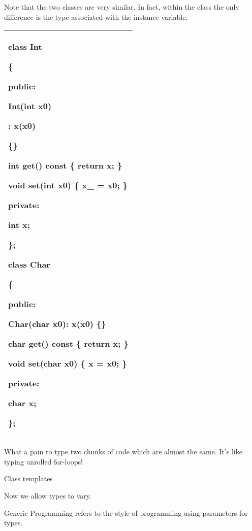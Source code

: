 \documentclass[
]{article}
\begin{document}
Note that the two classes are very similar. In fact, within the class
the only difference is the type associated with the instance variable.

\begin{longtable}[]{@{}l@{}}
\toprule
\endhead
\begin{minipage}[t]{0.97\columnwidth}\raggedright
class Int

\{

public:

Int(\textbf{int} x0)

: x(x0)

\{\}

\textbf{int} get() const \{ return x; \}

void set(\textbf{int} x0) \{ x\_ = x0; \}

private:

\textbf{int} x;

\};

class Char

\{

public:

Char(\textbf{char} x0): x(x0) \{\}

\textbf{char} get() const \{ return x; \}

void set(\textbf{char} x0) \{ x = x0; \}

private:

\textbf{char} x;

\};\strut
\end{minipage}\tabularnewline
\bottomrule
\end{longtable}

What a pain to type two chunks of code which are almost the same. It's
like typing unrolled for-loops!

Class templates

Now we allow types to vary.

Generic Programming refers to the style of programming using parameters
for types.
\end{document}
